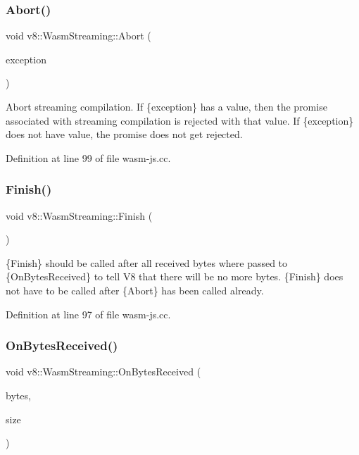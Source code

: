 \subsubsection{\texorpdfstring{Abort()}{Abort()}}
{\footnotesize\ttfamily void v8\+::\+Wasm\+Streaming\+::\+Abort (\begin{DoxyParamCaption}\item[{\mbox{\hyperlink{classv8_1_1MaybeLocal}{Maybe\+Local}}$<$ \mbox{\hyperlink{classv8_1_1Value}{Value}} $>$}]{exception }\end{DoxyParamCaption})}

Abort streaming compilation. If \{exception\} has a value, then the promise associated with streaming compilation is rejected with that value. If \{exception\} does not have value, the promise does not get rejected. 

Definition at line 99 of file wasm-\/js.\+cc.

\mbox{\label{classv8_1_1WasmStreaming_a2c40c85c34643af871577ea98d792de6}} 
\subsubsection{\texorpdfstring{Finish()}{Finish()}}
{\footnotesize\ttfamily void v8\+::\+Wasm\+Streaming\+::\+Finish (\begin{DoxyParamCaption}{ }\end{DoxyParamCaption})}

\{Finish\} should be called after all received bytes where passed to \{On\+Bytes\+Received\} to tell V8 that there will be no more bytes. \{Finish\} does not have to be called after \{Abort\} has been called already. 

Definition at line 97 of file wasm-\/js.\+cc.

\mbox{\label{classv8_1_1WasmStreaming_ada886a06f191ac65897763bda60c2f54}} 
\subsubsection{\texorpdfstring{On\+Bytes\+Received()}{OnBytesReceived()}}
{\footnotesize\ttfamily void v8\+::\+Wasm\+Streaming\+::\+On\+Bytes\+Received (\begin{DoxyParamCaption}\item[{const uint8\+\_\+t $\ast$}]{bytes,  }\item[{\mbox{\hyperlink{classsize__t}{size\+\_\+t}}}]{size }\end{DoxyParamCaption})}

